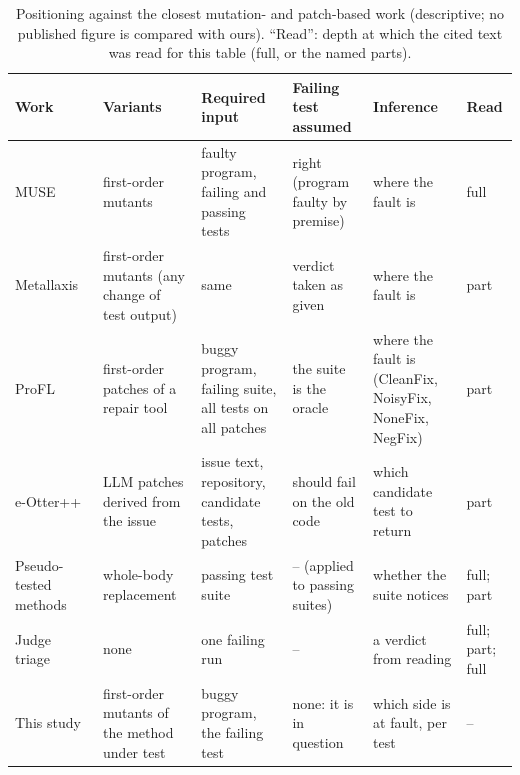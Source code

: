 \documentclass[pdflatex,iicol,sn-mathphys-num]{sn-jnl}
\begin{document}
\begin{table}[t]
\caption{Positioning against the closest mutation- and patch-based work (descriptive; no published figure is compared with ours). ``Read'': depth at which the cited text was read for this table (full, or the named parts).}\label{tab:positioning}
\footnotesize
\setlength{\tabcolsep}{3pt}
\begin{tabularx}{\textwidth}{@{}l Y Y Y Y l@{}}
\toprule
Work & Variants & Required input & Failing test assumed & Inference & Read \\
\midrule
MUSE~\cite{moon2014muse} & first-order mutants & faulty program, failing and passing tests & right (program faulty by premise) & where the fault is & full \\
Metallaxis~\cite{papadakis2015metallaxis} & first-order mutants (any change of test output) & same & verdict taken as given & where the fault is & part \\
ProFL~\cite{lou2020profl} & first-order patches of a repair tool & buggy program, failing suite, all tests on all patches & the suite is the oracle & where the fault is (CleanFix, NoisyFix, NoneFix, NegFix) & part \\
e-Otter++~\cite{ahmed2026eotter} & LLM patches derived from the issue & issue text, repository, candidate tests, patches & should fail on the old code & which candidate test to return & part \\
Pseudo-tested methods~\cite{niedermayr2016will,vera2018pseudo} & whole-body replacement & passing test suite & -- (applied to passing suites) & whether the suite notices & full; part \\
Judge triage~\cite{wang2025json,becker2026jit,zhang2026testagent} & none & one failing run & -- & a verdict from reading & full; part; full \\
\midrule
This study & first-order mutants of the method under test & buggy program, the failing test & none: it is in question & which side is at fault, per test & -- \\
\bottomrule
\end{tabularx}
\end{table}
\end{document}
